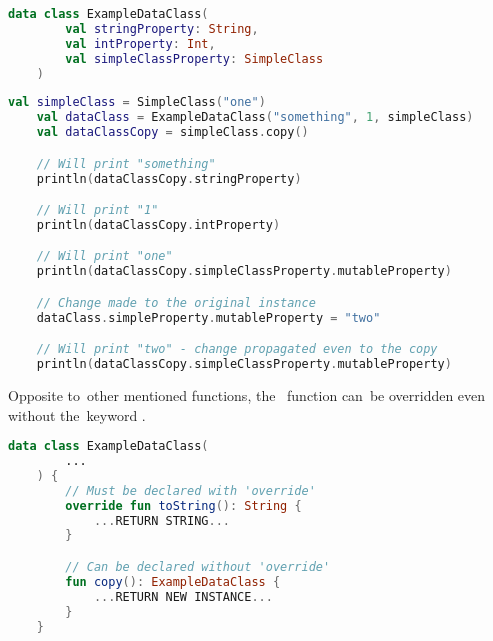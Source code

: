 \begin{lstlisting}[language=Kotlin, title={Data class}]
    data class ExampleDataClass(
        val stringProperty: String,
        val intProperty: Int,
        val simpleClassProperty: SimpleClass
    )
\end{lstlisting}
\begin{lstlisting}[language=Kotlin, title={\itq{copy} behavior}]
    val simpleClass = SimpleClass("one")
    val dataClass = ExampleDataClass("something", 1, simpleClass)
    val dataClassCopy = simpleClass.copy()

    // Will print "something"
    println(dataClassCopy.stringProperty)

    // Will print "1"
    println(dataClassCopy.intProperty)

    // Will print "one"
    println(dataClassCopy.simpleClassProperty.mutableProperty)

    // Change made to the original instance
    dataClass.simpleProperty.mutableProperty = "two"

    // Will print "two" - change propagated even to the copy
    println(dataClassCopy.simpleClassProperty.mutableProperty)
\end{lstlisting}

\warning Opposite to~other mentioned functions, \mbox{the } function can~be overridden even without the~keyword \mbox{.}

\begin{lstlisting}[language=Kotlin]
    data class ExampleDataClass(
        ...
    ) {
        // Must be declared with 'override'
        override fun toString(): String {
            ...RETURN STRING...
        }

        // Can be declared without 'override'
        fun copy(): ExampleDataClass {
            ...RETURN NEW INSTANCE...
        }
    }
\end{lstlisting}
\newpage
